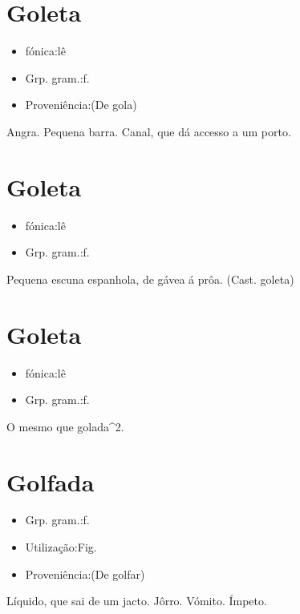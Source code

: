 \section{Goleta}
\begin{itemize}
\item {fónica:lê}
\end{itemize}
\begin{itemize}
\item {Grp. gram.:f.}
\end{itemize}
\begin{itemize}
\item {Proveniência:(De \textunderscore gola\textunderscore )}
\end{itemize}
Angra.
Pequena barra.
Canal, que dá accesso a um porto.
\section{Goleta}
\begin{itemize}
\item {fónica:lê}
\end{itemize}
\begin{itemize}
\item {Grp. gram.:f.}
\end{itemize}
Pequena escuna espanhola, de gávea á prôa.
(Cast. \textunderscore goleta\textunderscore )
\section{Goleta}
\begin{itemize}
\item {fónica:lê}
\end{itemize}
\begin{itemize}
\item {Grp. gram.:f.}
\end{itemize}
O mesmo que \textunderscore golada\textunderscore ^2.
\section{Golfada}
\begin{itemize}
\item {Grp. gram.:f.}
\end{itemize}
\begin{itemize}
\item {Utilização:Fig.}
\end{itemize}
\begin{itemize}
\item {Proveniência:(De \textunderscore golfar\textunderscore )}
\end{itemize}
Líquido, que sai de um jacto.
Jôrro.
Vómito.
Ímpeto.
